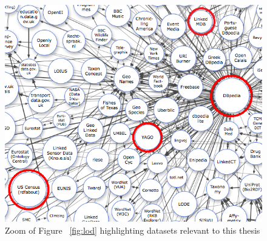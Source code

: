 \begin{figure}[h!]
\label{fig:lodZoom}
\begin{center}
  \includegraphics[width=1\linewidth]{./Figures/lod-zoom.png}
\end{center}
\caption{Zoom of Figure ~\ref{fig:lod} highlighting datasets relevant to this thesis}
\end{figure}
